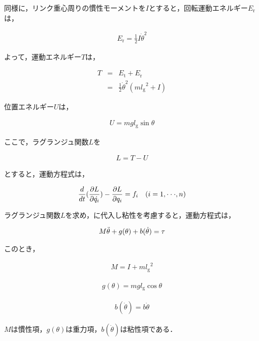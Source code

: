 同様に，リンク重心周りの慣性モーメントを$I$とすると，回転運動エネルギー$E_{\mathrm{r}}$は，

\begin{eqnarray}
  E_{\mathrm{r}} 
  =\frac{1}{2}I{\dot{\theta}}^2
\end{eqnarray}

よって，運動エネルギー$T$は，

\begin{eqnarray}
  T
  &=&E_{\mathrm{t}} + E_{\mathrm{r}} \nonumber \\
  &=&\frac{1}{2}{\dot{\theta}}^2(m{l_{\mathrm{g}}}^2 + I)
\end{eqnarray}

位置エネルギー$U$は，

\begin{eqnarray}
  U
  = mgl_{\mathrm{g}}\sin\theta
\end{eqnarray}

ここで，ラグランジュ関数$L$を

\begin{eqnarray}
  L
  =T - U
\end{eqnarray}

とすると，運動方程式は，

\begin{eqnarray}
  \equlabel{3.8}
  \frac{d}{dt}(\frac{\partial L}{\partial \dot{q_{i}}}) - \frac{\partial L}{\partial q_{i}} = f_{i} \quad (i = 1,\cdot\cdot\cdot, n)
\end{eqnarray}

ラグランジュ関数$L$を求め，に代入し粘性を考慮すると，運動方程式は，

\begin{eqnarray}
  \equlabel{3.9}
  M\ddot{\theta} + g(\theta) + b(\dot{\theta}) = \tau
\end{eqnarray}

このとき，

\begin{eqnarray}
  M = I + m{l_{\mathrm{g}}}^2
\end{eqnarray}

\begin{eqnarray}
  g(\theta) = mgl_{\mathrm{g}}\cos\theta
\end{eqnarray}

\begin{eqnarray}
  b(\dot{\theta}) = b\dot{\theta}
\end{eqnarray}

$M$は慣性項，$g(\theta)$は重力項，$b(\dot{\theta})$は粘性項である．

